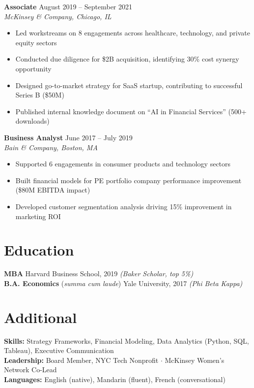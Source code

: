 \documentclass[11pt,a4paper]{article}
\begin{document}
\noindent\textbf{Associate} \hfill August 2019 -- September 2021\\
\textit{McKinsey \& Company, Chicago, IL}
\begin{itemize}[leftmargin=1.5em,nosep,label={\color{accent}\textendash}]
\item Led workstreams on 8 engagements across healthcare, technology, and private equity sectors
\item Conducted due diligence for \$2B acquisition, identifying 30\% cost synergy opportunity
\item Designed go-to-market strategy for SaaS startup, contributing to successful Series B (\$50M)
\item Published internal knowledge document on ``AI in Financial Services'' (500+ downloads)
\end{itemize}
\vspace{0.5em}

\noindent\textbf{Business Analyst} \hfill June 2017 -- July 2019\\
\textit{Bain \& Company, Boston, MA}
\begin{itemize}[leftmargin=1.5em,nosep,label={\color{accent}\textendash}]
\item Supported 6 engagements in consumer products and technology sectors
\item Built financial models for PE portfolio company performance improvement (\$80M EBITDA impact)
\item Developed customer segmentation analysis driving 15\% improvement in marketing ROI
\end{itemize}

\section{Education}
\noindent\textbf{MBA} \hfill Harvard Business School, 2019 \quad\textit{(Baker Scholar, top 5\%)}\\
\textbf{B.A. Economics} (\textit{summa cum laude}) \hfill Yale University, 2017 \quad\textit{(Phi Beta Kappa)}

\section{Additional}
\noindent\textbf{Skills:} Strategy Frameworks, Financial Modeling, Data Analytics (Python, SQL, Tableau), Executive Communication\\
\textbf{Leadership:} Board Member, NYC Tech Nonprofit $\cdot$ McKinsey Women's Network Co-Lead\\
\textbf{Languages:} English (native), Mandarin (fluent), French (conversational)
\end{document}
